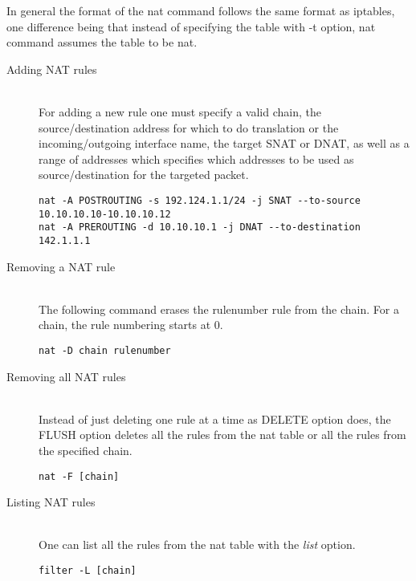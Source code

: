 {{In general the format of the nat command follows the same format as iptables, one difference being that instead of specifying the table with -t option, nat command assumes the table to be nat. 
\begin{description}
\item [Adding NAT rules] \hfill \\
For adding a new rule one must specify a valid chain, the source/destination address for which to do translation or the incoming/outgoing interface name, the target SNAT or DNAT, as well as a range of addresses which specifies which addresses to be used as source/destination for the targeted packet.
\lstset{language=TeX,caption=Adding a NAT rule,label=lst:saddrule}
\begin{lstlisting}
nat -A POSTROUTING -s 192.124.1.1/24 -j SNAT --to-source 10.10.10.10-10.10.10.12
nat -A PREROUTING -d 10.10.10.1 -j DNAT --to-destination 142.1.1.1
\end{lstlisting}
\item[Removing a NAT rule] \hfill \\
The following command erases the rulenumber rule from the chain. For a chain, the rule numbering starts at 0.
\lstset{language=TeX,caption=Deleting a NAT rule,label=lst:sdelrule}
\begin{lstlisting}
nat -D chain rulenumber
\end{lstlisting}
\item[Removing all NAT rules] \hfill \\
Instead of just deleting one rule at a time as DELETE option does, the FLUSH option deletes all the rules from the nat table or all the rules from the specified chain.
\lstset{language=TeX,caption=Deleting more NAT rules,label=lst:sdelallrules}
\begin{lstlisting}
nat -F [chain]
\end{lstlisting}
\item [Listing NAT rules] \hfill \\
One can list all the rules from the nat table with the \textit{list} option.
\lstset{language=TeX,caption=List NAT rules,label=lst:slstrule}
\begin{lstlisting}
filter -L [chain]
\end{lstlisting}
\end{description}

}}
